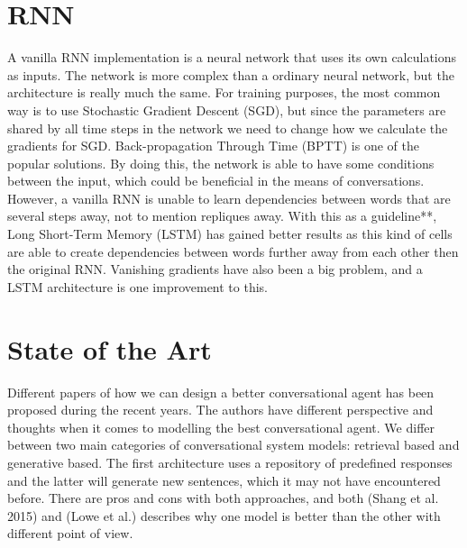 \documentclass{article} %
\begin{document}

\section{RNN}
A vanilla RNN implementation is a neural network that uses its own calculations as inputs. The network is more complex than a ordinary neural network, but the architecture is really much the same. For training purposes, the most common way is to use Stochastic Gradient Descent (SGD), but since the parameters are shared by all time steps in the network we need to change how we calculate the gradients for SGD. Back-propagation Through Time (BPTT) is one of the popular solutions. By doing this, the network is able to have some conditions between the input, which could be beneficial in the means of conversations. However, a vanilla RNN is unable to learn dependencies between words that are several steps away, not to mention repliques away. With this as a guideline**, Long Short-Term Memory (LSTM) has gained better results as this kind of cells are able to create dependencies between words further away from each other then the original RNN. Vanishing gradients have also been a big problem, and a LSTM architecture is one improvement to this.


\section{State of the Art}
Different papers of how we can design a better conversational agent has been proposed during the recent years. The authors have different perspective and thoughts when it comes to modelling the best conversational agent. We differ between two main categories of conversational system models: retrieval based and generative based. The first architecture uses a repository of predefined responses and the latter will generate new sentences, which it may not have encountered before. There are pros and cons with both approaches, and both (Shang et al. 2015) and (Lowe et al.) describes why one model is better than the other with different point of view. 
\end{document}
